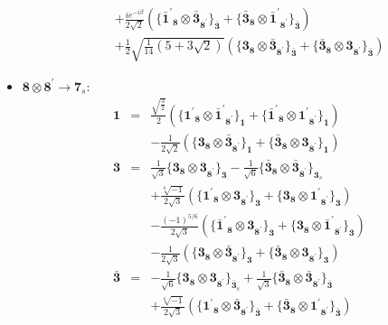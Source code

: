 \documentclass[english]{article}
\newcommand{\subcg}[3]{\big\{ {#1}\otimes{#2}\big\}^{}_{#3}}
\newcommand{\rep}[1]{\mathbf{#1}}
\begin{document}
\begin{itemize}
\begin{eqnarray*}
 & & +\frac{i e^{-i \beta }}{2 \sqrt{2}}\left(\subcg{\rep{\bar{1}^{\prime}}_{\rep{8}}}{\rep{\bar{3}}_{\rep{8^{\prime}}}}{\rep{\bar{3}}}+\subcg{\rep{\bar{3}}_{\rep{8}}}{\rep{\bar{1}^{\prime}}_{\rep{8^{\prime}}}}{\rep{\bar{3}}}\right) \\ 
 & & +\frac{1}{2} \sqrt{\frac{1}{14} \left(5+3 \sqrt{2}\right)}\left(\subcg{\rep{3}_{\rep{8}}}{\rep{\bar{3}}_{\rep{8^{\prime}}}}{\rep{\bar{3}}}+\subcg{\rep{\bar{3}}_{\rep{8}}}{\rep{3}_{\rep{8^{\prime}}}}{\rep{\bar{3}}}\right)
\end{eqnarray*}
\item $\rep{8}\otimes\rep{8^{\prime}}\to\rep{7}_{s}$:
\begin{eqnarray*}
\rep{1} &=& \frac{\sqrt{\frac{3}{2}}}{2}\left(\subcg{\rep{1^{\prime}}_{\rep{8}}}{\rep{\bar{1}^{\prime}}_{\rep{8^{\prime}}}}{\rep{1}}+\subcg{\rep{\bar{1}^{\prime}}_{\rep{8}}}{\rep{1^{\prime}}_{\rep{8^{\prime}}}}{\rep{1}}\right) \\ 
 & & -\frac{1}{2 \sqrt{2}}\left(\subcg{\rep{3}_{\rep{8}}}{\rep{\bar{3}}_{\rep{8^{\prime}}}}{\rep{1}}+\subcg{\rep{\bar{3}}_{\rep{8}}}{\rep{3}_{\rep{8^{\prime}}}}{\rep{1}}\right)
\\
\rep{3} &=& \frac{1}{\sqrt{3}}\subcg{\rep{3}_{\rep{8}}}{\rep{3}_{\rep{8^{\prime}}}}{\rep{3}}-\frac{1}{\sqrt{6}}\subcg{\rep{\bar{3}}_{\rep{8}}}{\rep{\bar{3}}_{\rep{8^{\prime}}}}{\rep{3}_{s}} \\ 
 & & +\frac{\sqrt[6]{-1}}{2 \sqrt{3}}\left(\subcg{\rep{1^{\prime}}_{\rep{8}}}{\rep{3}_{\rep{8^{\prime}}}}{\rep{3}}+\subcg{\rep{3}_{\rep{8}}}{\rep{1^{\prime}}_{\rep{8^{\prime}}}}{\rep{3}}\right) \\ 
 & & -\frac{(-1)^{5/6}}{2 \sqrt{3}}\left(\subcg{\rep{\bar{1}^{\prime}}_{\rep{8}}}{\rep{3}_{\rep{8^{\prime}}}}{\rep{3}}+\subcg{\rep{3}_{\rep{8}}}{\rep{\bar{1}^{\prime}}_{\rep{8^{\prime}}}}{\rep{3}}\right) \\ 
 & & -\frac{1}{2 \sqrt{3}}\left(\subcg{\rep{3}_{\rep{8}}}{\rep{\bar{3}}_{\rep{8^{\prime}}}}{\rep{3}}+\subcg{\rep{\bar{3}}_{\rep{8}}}{\rep{3}_{\rep{8^{\prime}}}}{\rep{3}}\right)
\\
\rep{\bar{3}} &=& -\frac{1}{\sqrt{6}}\subcg{\rep{3}_{\rep{8}}}{\rep{3}_{\rep{8^{\prime}}}}{\rep{\bar{3}}_{s}}+\frac{1}{\sqrt{3}}\subcg{\rep{\bar{3}}_{\rep{8}}}{\rep{\bar{3}}_{\rep{8^{\prime}}}}{\rep{\bar{3}}} \\ 
 & & +\frac{\sqrt[6]{-1}}{2 \sqrt{3}}\left(\subcg{\rep{1^{\prime}}_{\rep{8}}}{\rep{\bar{3}}_{\rep{8^{\prime}}}}{\rep{\bar{3}}}+\subcg{\rep{\bar{3}}_{\rep{8}}}{\rep{1^{\prime}}_{\rep{8^{\prime}}}}{\rep{\bar{3}}}\right) \\ 

\end{eqnarray*}
\end{itemize}
\end{document}
